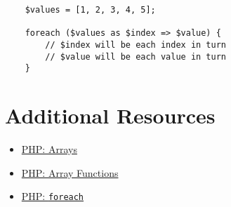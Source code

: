 \begin{verbatim}
    $values = [1, 2, 3, 4, 5];

    foreach ($values as $index => $value) {
        // $index will be each index in turn
        // $value will be each value in turn
    }
\end{verbatim}




\section{Additional Resources}

\begin{itemize}[leftmargin=*]
    \item \href{http://www.php.net/manual/en/language.types.array.php}{PHP: Arrays}
    \item \href{https://www.php.net/manual/en/ref.array.php}{PHP: Array Functions}
    \item \href{http://www.php.net/manual/en/control-structures.foreach.php}{PHP: \texttt{foreach}}
\end{itemize}
